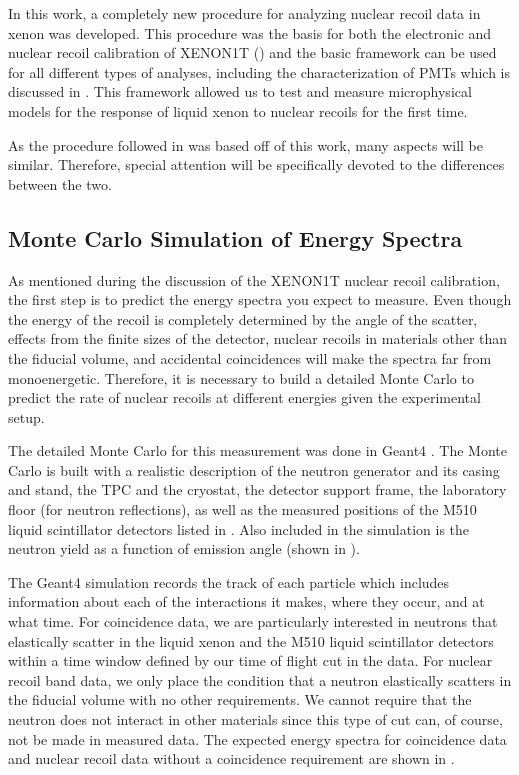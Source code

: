 In this work, a completely new procedure for analyzing nuclear recoil data in xenon was developed.  This procedure was the basis for both the electronic and nuclear recoil calibration of XENON1T () and the basic framework can be used for all different types of analyses, including the characterization of PMTs which is discussed in .  This framework allowed us to test and measure microphysical models for the response of liquid xenon to nuclear recoils for the first time.   

As the procedure followed in  was based off of this work, many aspects will be similar.  Therefore, special attention will be specifically devoted to the differences between the two.



\subsection{Monte Carlo Simulation of Energy Spectra}
\label{sec:nerix_geant_mc}


As mentioned during the discussion of the XENON1T nuclear recoil calibration, the first step is to predict the energy spectra you expect to measure.  Even though the energy of the recoil is completely determined by the angle of the scatter, effects from the finite sizes of the detector, nuclear recoils in materials other than the fiducial volume, and accidental coincidences will make the spectra far from monoenergetic.  Therefore, it is necessary to build a detailed Monte Carlo to predict the rate of nuclear recoils at different energies given the experimental setup.

The detailed Monte Carlo for this measurement was done in Geant4 \cite{agostinelli2003geant4}.  The Monte Carlo is built with a realistic description of the neutron generator and its casing and stand, the TPC and the cryostat, the detector support frame, the laboratory floor (for neutron reflections), as well as the measured positions of the M510 liquid scintillator detectors listed in .  Also included in the simulation is the neutron yield as a function of emission angle (shown in ).

The Geant4 simulation records the track of each particle which includes information about each of the interactions it makes, where they occur, and at what time.  For coincidence data, we are particularly interested in neutrons that elastically scatter in the liquid xenon and the M510 liquid scintillator detectors within a time window defined by our time of flight cut in the data.  For nuclear recoil band data, we only place the condition that a neutron elastically scatters in the fiducial volume with no other requirements.  We cannot require that the neutron does not interact in other materials since this type of cut can, of course, not be made in measured data.  The expected energy spectra for coincidence data and nuclear recoil data without a coincidence requirement are shown in .

